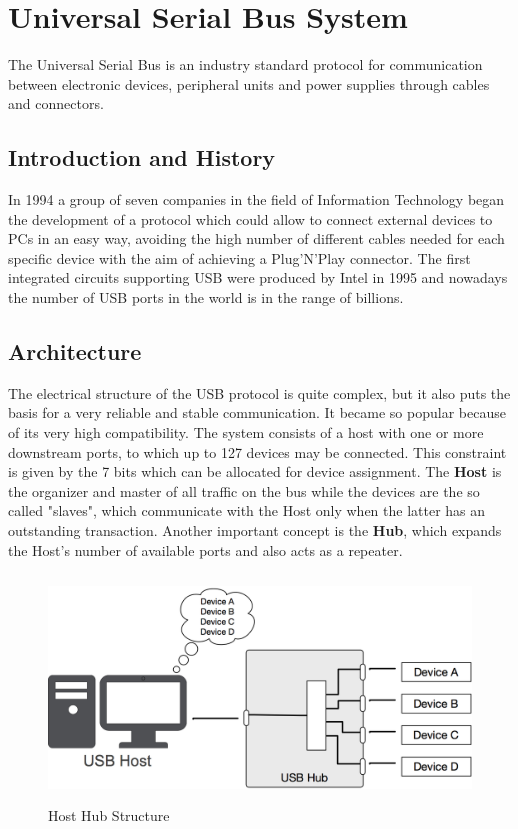 \documentclass{article}
\begin{document}
\section{Universal Serial Bus System}
The Universal Serial Bus is an industry standard protocol for communication between electronic devices, peripheral units and power supplies through cables and connectors.
\subsection{Introduction and History}
In 1994 a group of seven companies in the field of Information Technology began the development of a protocol which could allow to connect external devices to PCs in an easy way, avoiding the high number of different cables needed for each specific device with the aim of achieving a Plug'N'Play connector. The first integrated circuits supporting USB were produced by Intel in 1995 and nowadays the number of USB ports in the world is in the range of billions.
\subsection{Architecture}
The electrical structure of the USB protocol is quite complex, but it also puts the basis for a very reliable and stable communication. It became so popular because of its very high compatibility.
The system consists of a host with one or more downstream ports, to which up to 127 devices may be connected. This constraint is given by the 7 bits which can be allocated for device assignment. 
\newline
\newline
The \textbf{Host} is the organizer and master of all traffic on the bus while the devices are the so called "slaves", which communicate with the Host only when the latter has an outstanding transaction. Another important concept is the \textbf{Hub}, which expands the Host's number of available ports and also acts as a repeater.

\begin{figure}[h]    
    \centering
    \includegraphics[width=13cm, height=6cm,center]{images/host-hub-structure}
    \caption{Host Hub Structure}
\end{figure}
\end{document}
